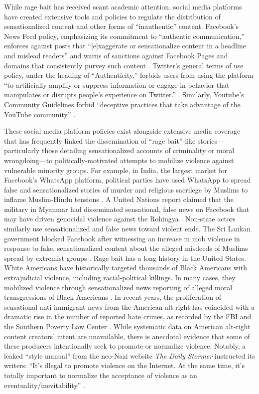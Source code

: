 While rage bait has received scant academic attention, social media platforms have created extensive tools and policies to regulate the distribution of sensationalized content and other forms of ``inauthentic'' content. Facebook's News Feed policy, emphasizing its commitment to ``authentic communication,'' enforces against posts that ``[e]xaggerate or sensationalize content in a headline and mislead readers'' and warns of sanctions against Facebook Pages and domains that consistently purvey such content \citep{facebook2021}. Twitter's general terms of use policy, under the heading of ``Authenticity,'' forbids users from using the platform ``to artificially amplify or suppress information or engage in behavior that manipulates or disrupts people’s experience on Twitter.'' \citep{twitter2021}. Similarly, Youtube's Community Guidelines forbid ``deceptive practices that take advantage of the YouTube community'' \citep{youtube2021}.

These social media platform policies exist alongside extensive media coverage that has frequently linked the dissemination of ``rage bait''-like stories---particularly those detailing sensationalized accounts of criminality or moral wrongdoing---to politically-motivated attempts to mobilize violence against vulnerable minority groups. For example, in India, the largest market for Facebook's WhatsApp platform, political parties have used WhatsApp to spread false and sensationalized stories of murder and religious sacrilege by Muslims to inflame Muslim-Hindu tensions \citep{parth2018}. A United Nations report claimed that the military in Myanmar had disseminated sensational, false news on Facebook that may have driven genocidal violence against the Rohingya \citep{mozur2018}. Non-state actors similarly use sensationalized and false news toward violent ends. The Sri Lankan government blocked Facebook after witnessing an increase in mob violence in response to fake, sensationalized content about the alleged misdeeds of Muslims spread by extremist groups \citep{goel2018b}. Rage bait has a long history in the United States. White Americans have historically targeted thousands of Black Americans with extrajudicial violence, including racial-political killings. In many cases, they mobilized violence through sensationalized news reporting of alleged moral transgressions of Black Americans \citep{francis2020white}. In recent years, the proliferation of sensational anti-immigrant news from the American alt-right has coincided with a dramatic rise in the number of reported hate crimes, as recorded by the FBI and the Southern Poverty Law Center \citep{barrett_2018}. While systematic data on American alt-right content creators' intent are unavailable, there is anecdotal evidence that some of these producers intentionally seek to promote or normalize violence. Notably, a leaked ``style manual'' from the neo-Nazi website \textit{The Daily Stormer} instructed its writers: ``It's illegal to promote violence on the Internet. At the same time, it’s totally important to normalize the acceptance of violence as an eventuality/inevitability'' \citep{feinberg2017daily}. 

